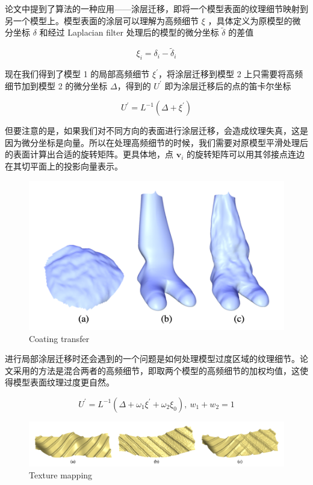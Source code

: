\documentclass[lang=cn,11pt,a4paper]{elegantpaper}
\begin{document}
论文中提到了算法的一种应用——涂层迁移，即将一个模型表面的纹理细节映射到另一个模型上。模型表面的涂层可以理解为高频细节 $\xi$ ，具体定义为原模型的微分坐标 $\delta$ 和经过 Laplacian filter 处理后的模型的微分坐标 $\tilde{\delta}$ 的差值

\begin{equation}
    \xi_{i}=\delta_{i}-\tilde{\delta}_{i}
\end{equation}

现在我们得到了模型 1 的局部高频细节 $\xi^{\prime}$，将涂层迁移到模型 2 上只需要将高频细节加到模型 2 的微分坐标 $\Delta$，得到的 $U^{\prime}$ 即为涂层迁移后的点的笛卡尔坐标

\begin{equation}
    U^{\prime}=L^{-1}\left(\Delta+\xi^{\prime}\right)
\end{equation}

但要注意的是，如果我们对不同方向的表面进行涂层迁移，会造成纹理失真，这是因为微分坐标是向量。所以在处理高频细节的时候，我们需要对原模型平滑处理后的表面计算出合适的旋转矩阵。更具体地，点 $\mathbf{v}_{i}$ 的旋转矩阵可以用其邻接点连边在其切平面上的投影向量表示。

\newpage

\begin{figure}[ht]
    \centering
    \includegraphics[width=0.5\linewidth]{image/coating_transfer.png}
    \caption{Coating transfer}
\end{figure}

进行局部涂层迁移时还会遇到的一个问题是如何处理模型过度区域的纹理细节。论文采用的方法是混合两者的高频细节，即取两个模型的高频细节的加权均值，这使得模型表面纹理过度更自然。

\begin{equation}
    U^{\prime}=L^{-1}\left(\Delta+\omega_{1}\xi^{\prime}+\omega_{2}\xi_{0}\right), \ w_1+w_2 = 1
\end{equation}

\begin{figure}[ht]
    \centering
    \includegraphics[width=0.95\linewidth]{image/texture_mapping.png}
    \caption{Texture mapping}
\end{figure}
\end{document}
